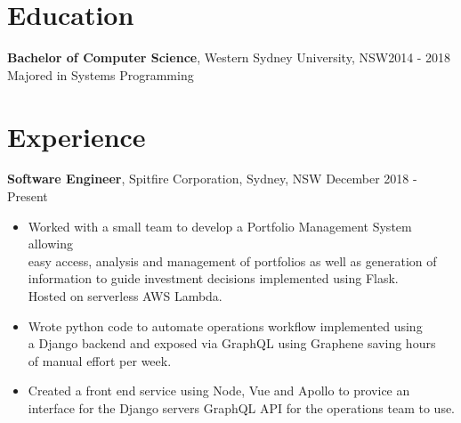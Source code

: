 \documentclass[margin]{res}
\begin{document}

\address{{\bf Present Address} \\ 26/23-25 John Street\\ Lidcombe, NSW 2141}
\address{{\bf Contact Details} \\ ben.hili1994@gmail.com \\ +61414329597}


\begin{resume}

\section{Education}
	{\bf Bachelor of Computer Science}, Western Sydney University, NSW\hfill 2014 - 2018\\ 
	Majored in Systems Programming

\section{Experience}
{\bf Software Engineer}, 
	Spitfire Corporation, Sydney, NSW \hfill December 2018 - Present
\begin{itemize} \itemsep 2pt  %

\item Worked with a small team to develop a Portfolio Management System allowing \\
	easy access, analysis and management of portfolios as well as generation of \\
		information to guide investment decisions implemented using Flask. \\
		Hosted on serverless AWS Lambda.

\item Wrote python code to automate operations workflow implemented using \\
	a Django backend and exposed via GraphQL using Graphene saving hours \\
		of manual effort per week.

\item Created a front end service using Node, Vue and Apollo to provice an \\
	interface for the Django servers GraphQL API for the operations team to use. 
	
\end{itemize}


\end{resume}
\end{document}
